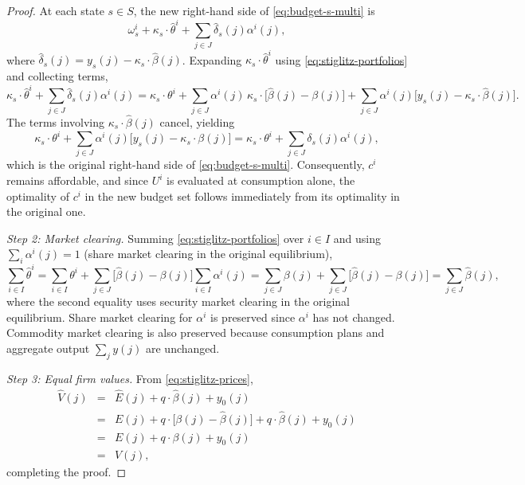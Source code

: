 \documentclass[11pt,a4paper,oneside]{book}
\theoremstyle{plain}
\theoremstyle{definition}
\theoremstyle{remark}
\numberwithin{equation}{chapter}
\begin{document}
\begin{proof}
At each state $s \in S$, the new right-hand side of \eqref{eq:budget-s-multi} is
\begin{equation*}
  \omega^i_s + \kappa_s \cdot \widehat{\theta}^i + \sum_{j \in J} \widehat{\delta}_s(j) \alpha^i(j),
\end{equation*}
where $\widehat{\delta}_s(j) = y_s(j) - \kappa_s \cdot \widehat{\beta}(j)$.
Expanding $\kappa_s \cdot \widehat{\theta}^i$ using \eqref{eq:stiglitz-portfolios} and collecting terms,
\begin{equation*}
  \kappa_s \cdot \widehat{\theta}^i + \sum_{j \in J} \widehat{\delta}_s(j) \alpha^i(j)
  = \kappa_s \cdot \theta^i + \sum_{j \in J} \alpha^i(j) \, \kappa_s \cdot \bigl[ \widehat{\beta}(j) - \beta(j) \bigr]
    + \sum_{j \in J} \alpha^i(j) \bigl[ y_s(j) - \kappa_s \cdot \widehat{\beta}(j) \bigr].
\end{equation*}
The terms involving $\kappa_s \cdot \widehat{\beta}(j)$ cancel, yielding
\begin{equation*}
  \kappa_s \cdot \theta^i + \sum_{j \in J} \alpha^i(j) \bigl[ y_s(j) - \kappa_s \cdot \beta(j) \bigr]
  = \kappa_s \cdot \theta^i + \sum_{j \in J} \delta_s(j) \alpha^i(j),
\end{equation*}
which is the original right-hand side of \eqref{eq:budget-s-multi}.
Consequently, $c^i$ remains affordable, and since $U^i$ is evaluated at consumption alone, the optimality of $c^i$ in the new budget set follows immediately from its optimality in the original one.

\emph{Step 2: Market clearing.}
Summing \eqref{eq:stiglitz-portfolios} over $i \in I$ and using $\sum_i \alpha^i(j) = 1$ (share market clearing in the original equilibrium),
\begin{equation*}
  \sum_{i \in I} \widehat{\theta}^i
  = \sum_{i \in I} \theta^i + \sum_{j \in J} \bigl[ \widehat{\beta}(j) - \beta(j) \bigr] \sum_{i \in I} \alpha^i(j)
  = \sum_{j \in J} \beta(j) + \sum_{j \in J} \bigl[ \widehat{\beta}(j) - \beta(j) \bigr]
  = \sum_{j \in J} \widehat{\beta}(j),
\end{equation*}
where the second equality uses security market clearing in the original equilibrium.
Share market clearing for $\alpha^i$ is preserved since $\alpha^i$ has not changed.
Commodity market clearing is also preserved because consumption plans and aggregate output $\sum_j y(j)$ are unchanged.

\emph{Step 3: Equal firm values.}
From \eqref{eq:stiglitz-prices},
\begin{eqnarray*}
  \widehat{V}(j) & = & \widehat{E}(j) + q \cdot \widehat{\beta}(j) + y_0(j) \\
  & = & E(j) + q \cdot \bigl[ \beta(j) - \widehat{\beta}(j) \bigr] + q \cdot \widehat{\beta}(j) + y_0(j) \\
  & = & E(j) + q \cdot \beta(j) + y_0(j) \\
  & = & V(j),
\end{eqnarray*}
completing the proof.
\end{proof}
\end{document}

